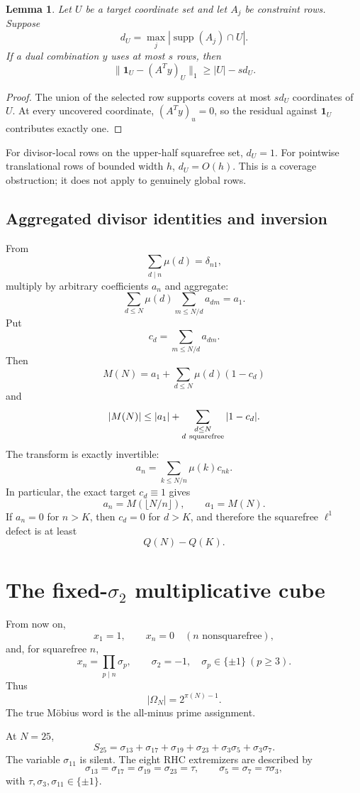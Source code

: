 \documentclass[11pt]{article}
\newtheorem{lemma}[theorem]{Lemma}
\begin{document}
\begin{lemma}
Let $U$ be a target coordinate set and let $A_j$ be constraint rows.  Suppose
\[
 d_U=\max_j|\operatorname{supp}(A_j)\cap U|.
\]
If a dual combination $y$ uses at most $s$ rows, then
\[
 \boxed{
 \|\mathbf1_U-(A^Ty)_U\|_1\ge |U|-sd_U.
 }
\]
\end{lemma}

\begin{proof}
The union of the selected row supports covers at most $sd_U$ coordinates of $U$.  At every uncovered coordinate, $(A^Ty)_u=0$, so the residual against $\mathbf1_U$ contributes exactly one.
\end{proof}

For divisor-local rows on the upper-half squarefree set, $d_U=1$.  For pointwise translational rows of bounded width $h$, $d_U=O(h)$.  This is a coverage obstruction; it does not apply to genuinely global rows.

\subsection{Aggregated divisor identities and inversion}

From
\[
 \sum_{d\mid n}\mu(d)=\delta_{n1},
\]
multiply by arbitrary coefficients $a_n$ and aggregate:
\[
 \sum_{d\le N}\mu(d)\sum_{m\le N/d}a_{dm}=a_1.
\]
Put
\[
 c_d=\sum_{m\le N/d}a_{dm}.
\]
Then
\[
 \boxed{
 M(N)=a_1+\sum_{d\le N}\mu(d)(1-c_d)
 }
\]
and
\[
 |M(N)|\le |a_1|
 +\sum_{\substack{d\le N\\d\ {\rm squarefree}}}|1-c_d|.
\]
The transform is exactly invertible:
\[
 \boxed{
 a_n=\sum_{k\le N/n}\mu(k)c_{nk}.
 }
\]
In particular, the exact target $c_d\equiv1$ gives
\[
 a_n=M(\lfloor N/n\rfloor),
 \qquad
 a_1=M(N).
\]
If $a_n=0$ for $n>K$, then $c_d=0$ for $d>K$, and therefore the squarefree $\ell^1$ defect is at least
\[
 Q(N)-Q(K).
\]

\section{The fixed-$\sigma_2$ multiplicative cube}

From now on,
\[
 x_1=1,\qquad
 x_n=0\quad(n\text{ nonsquarefree}),
\]
and, for squarefree $n$,
\[
 \boxed{
 x_n=\prod_{p\mid n}\sigma_p,
 \qquad
 \sigma_2=-1,\quad
 \sigma_p\in\{\pm1\}\ (p\ge3).
 }
\]
Thus
\[
 |\Omega_N|=2^{\pi(N)-1}.
\]
The true M\"obius word is the all-minus prime assignment.

At $N=25$,
\[
 \boxed{
 S_{25}
 =\sigma_{13}+\sigma_{17}+\sigma_{19}+\sigma_{23}
 +\sigma_3\sigma_5+\sigma_3\sigma_7.
 }
\]
The variable $\sigma_{11}$ is silent.  The eight RHC extremizers are described by
\[
 \sigma_{13}=\sigma_{17}=\sigma_{19}=\sigma_{23}=\tau,
 \qquad
 \sigma_5=\sigma_7=\tau\sigma_3,
\]
with $\tau,\sigma_3,\sigma_{11}\in\{\pm1\}$.
\end{document}
